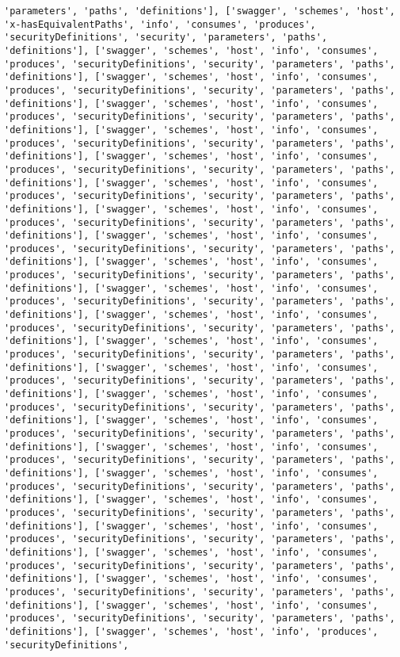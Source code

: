 \documentclass[11pt]{article}
\begin{document}
\begin{Verbatim}[commandchars=\\\{\}]
'parameters', 'paths', 'definitions'], ['swagger', 'schemes', 'host', 'x-hasEquivalentPaths', 'info', 'consumes', 'produces', 'securityDefinitions', 'security', 'parameters', 'paths', 'definitions'], ['swagger', 'schemes', 'host', 'info', 'consumes', 'produces', 'securityDefinitions', 'security', 'parameters', 'paths', 'definitions'], ['swagger', 'schemes', 'host', 'info', 'consumes', 'produces', 'securityDefinitions', 'security', 'parameters', 'paths', 'definitions'], ['swagger', 'schemes', 'host', 'info', 'consumes', 'produces', 'securityDefinitions', 'security', 'parameters', 'paths', 'definitions'], ['swagger', 'schemes', 'host', 'info', 'consumes', 'produces', 'securityDefinitions', 'security', 'parameters', 'paths', 'definitions'], ['swagger', 'schemes', 'host', 'info', 'consumes', 'produces', 'securityDefinitions', 'security', 'parameters', 'paths', 'definitions'], ['swagger', 'schemes', 'host', 'info', 'consumes', 'produces', 'securityDefinitions', 'security', 'parameters', 'paths', 'definitions'], ['swagger', 'schemes', 'host', 'info', 'consumes', 'produces', 'securityDefinitions', 'security', 'parameters', 'paths', 'definitions'], ['swagger', 'schemes', 'host', 'info', 'consumes', 'produces', 'securityDefinitions', 'security', 'parameters', 'paths', 'definitions'], ['swagger', 'schemes', 'host', 'info', 'consumes', 'produces', 'securityDefinitions', 'security', 'parameters', 'paths', 'definitions'], ['swagger', 'schemes', 'host', 'info', 'consumes', 'produces', 'securityDefinitions', 'security', 'parameters', 'paths', 'definitions'], ['swagger', 'schemes', 'host', 'info', 'consumes', 'produces', 'securityDefinitions', 'security', 'parameters', 'paths', 'definitions'], ['swagger', 'schemes', 'host', 'info', 'consumes', 'produces', 'securityDefinitions', 'security', 'parameters', 'paths', 'definitions'], ['swagger', 'schemes', 'host', 'info', 'consumes', 'produces', 'securityDefinitions', 'security', 'parameters', 'paths', 'definitions'], ['swagger', 'schemes', 'host', 'info', 'consumes', 'produces', 'securityDefinitions', 'security', 'parameters', 'paths', 'definitions'], ['swagger', 'schemes', 'host', 'info', 'consumes', 'produces', 'securityDefinitions', 'security', 'parameters', 'paths', 'definitions'], ['swagger', 'schemes', 'host', 'info', 'consumes', 'produces', 'securityDefinitions', 'security', 'parameters', 'paths', 'definitions'], ['swagger', 'schemes', 'host', 'info', 'consumes', 'produces', 'securityDefinitions', 'security', 'parameters', 'paths', 'definitions'], ['swagger', 'schemes', 'host', 'info', 'consumes', 'produces', 'securityDefinitions', 'security', 'parameters', 'paths', 'definitions'], ['swagger', 'schemes', 'host', 'info', 'consumes', 'produces', 'securityDefinitions', 'security', 'parameters', 'paths', 'definitions'], ['swagger', 'schemes', 'host', 'info', 'consumes', 'produces', 'securityDefinitions', 'security', 'parameters', 'paths', 'definitions'], ['swagger', 'schemes', 'host', 'info', 'consumes', 'produces', 'securityDefinitions', 'security', 'parameters', 'paths', 'definitions'], ['swagger', 'schemes', 'host', 'info', 'consumes', 'produces', 'securityDefinitions', 'security', 'parameters', 'paths', 'definitions'], ['swagger', 'schemes', 'host', 'info', 'produces', 'securityDefinitions', 
\end{Verbatim}
\end{document}
